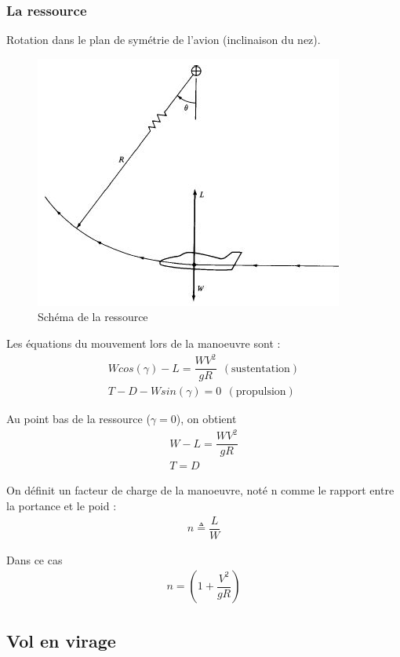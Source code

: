 \documentclass{report}
\begin{document}
\subsubsection{La ressource}
Rotation dans le plan de symétrie de l'avion (inclinaison du nez).

\begin{figure}[h!]
    \centering
    \includegraphics{16.JPG}
    \caption{Schéma de la ressource}
    \label{fig:my_label}
\end{figure}

Les équations du mouvement lors de la manoeuvre sont :
\begin{eqnarray}
W cos(\gamma)-L=\dfrac{WV^2}{gR}~~(\text{sustentation})\\
T-D-W sin(\gamma)=0~~(\text{propulsion})
\end{eqnarray}

Au point bas de la ressource ($\gamma=0$), on obtient
\begin{eqnarray}
W-L=\dfrac{W V^2}{gR}\\
T=D
\end{eqnarray}

On définit un facteur de charge de la manoeuvre, noté n comme le rapport entre la portance et le poid :
\begin{eqnarray}
n\triangleq \dfrac{L}{W}
\end{eqnarray}

Dans ce cas
\begin{eqnarray}
n=\left(1+\dfrac{V^2}{gR}\right)
\end{eqnarray}

\subsection{Vol en virage}
\end{document}
